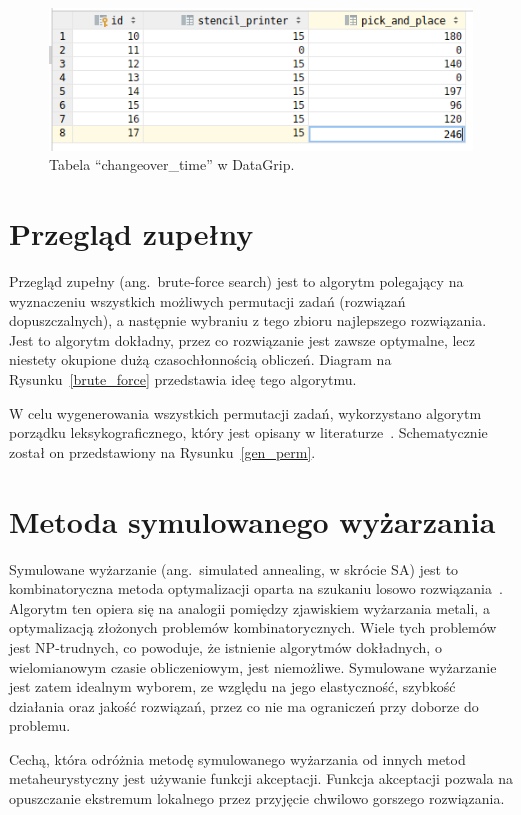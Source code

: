 \begin{figure}[H]
	\centering
	\includegraphics[scale=0.9]{chapters/chapter4/changeover_db.png}
	\caption{Tabela ``changeover\_time'' w DataGrip.}
	\label{dg:changeover}
\end{figure}

\section{Przegląd zupełny}

Przegląd zupełny (ang.\ brute-force search) jest to algorytm polegający na wyznaczeniu wszystkich możliwych permutacji zadań (rozwiązań dopuszczalnych), a następnie wybraniu z tego zbioru najlepszego rozwiązania. Jest to algorytm dokładny, przez co rozwiązanie jest zawsze optymalne, lecz niestety okupione dużą czasochłonnością obliczeń. Diagram na Rysunku~\ref{brute_force} przedstawia ideę tego algorytmu.

W celu wygenerowania wszystkich permutacji zadań, wykorzystano algorytm porządku leksykograficznego, który jest opisany w literaturze~\cite{legorder}. Schematycznie został on przedstawiony na Rysunku~\ref{gen_perm}.

\section{Metoda symulowanego wyżarzania}
Symulowane wyżarzanie (ang.\ simulated annealing, w skrócie SA) jest to kombinatoryczna metoda optymalizacji oparta na szukaniu losowo rozwiązania~\cite{sa}. Algorytm ten opiera się na analogii pomiędzy zjawiskiem wyżarzania metali, a optymalizacją złożonych problemów kombinatorycznych. Wiele tych problemów jest NP-trudnych, co powoduje, że istnienie algorytmów dokładnych, o wielomianowym czasie obliczeniowym, jest niemożliwe. Symulowane wyżarzanie jest zatem idealnym wyborem, ze względu na jego elastyczność, szybkość działania oraz jakość rozwiązań, przez co nie ma ograniczeń przy doborze do problemu.

Cechą, która odróżnia metodę symulowanego wyżarzania od innych metod metaheurystyczny jest używanie funkcji akceptacji. Funkcja akceptacji pozwala na opuszczanie ekstremum lokalnego przez przyjęcie chwilowo gorszego rozwiązania.

